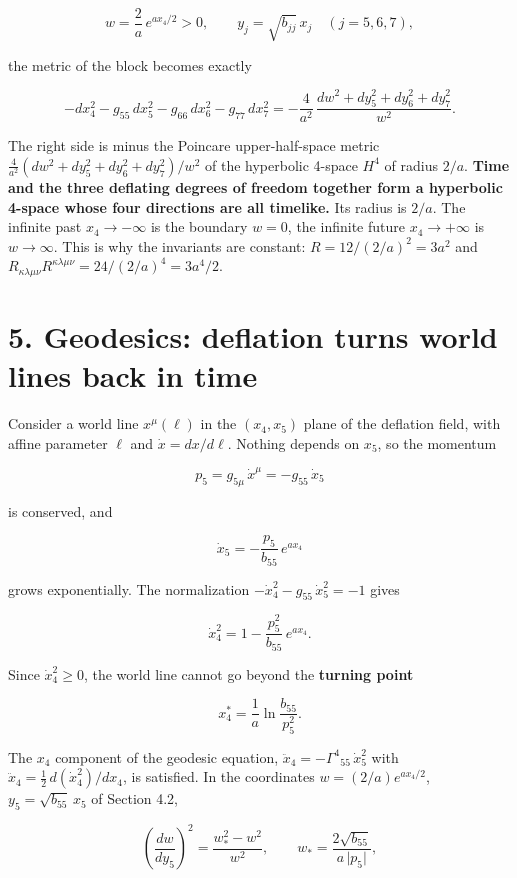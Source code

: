 \documentclass[10pt]{article}
\makeatletter
\newcommand\keepnext{\par\nopagebreak\@nobreaktrue\everypar{\@nobreakfalse\everypar{}}}
\makeatother
\begin{document}
\[
w = \frac2a\,e^{ax_4/2} > 0, \qquad y_j = \sqrt{b_{jj}}\,x_j \quad (j = 5, 6, 7),
\]

the metric of the block becomes exactly\keepnext


\[
-dx_4^2 - g_{55}\,dx_5^2 - g_{66}\,dx_6^2 - g_{77}\,dx_7^2 = -\frac{4}{a^2}\,\frac{dw^2 + dy_5^2 + dy_6^2 + dy_7^2}{w^2} .
\]

The right side is minus the Poincare upper-half-space metric $\frac{4}{a^2}(dw^2 + dy_5^2 + dy_6^2 + dy_7^2)/w^2$ of the hyperbolic 4-space $H^4$ of radius $2/a$. \textbf{Time and the three deflating degrees of freedom together form a hyperbolic 4-space whose four directions are all timelike.} Its radius is $2/a$. The infinite past $x_4 \to -\infty$ is the boundary $w = 0$, the infinite future $x_4 \to +\infty$ is $w \to \infty$. This is why the invariants are constant: $R = 12/(2/a)^2 = 3a^2$ and $R_{\kappa\lambda\mu\nu}R^{\kappa\lambda\mu\nu} = 24/(2/a)^4 = 3a^4/2$.


\section*{5. Geodesics: deflation turns world lines back in time}

Consider a world line $x^\mu(\ell)$ in the $(x_4, x_5)$ plane of the deflation field, with affine parameter $\ell$ and $\dot x = dx/d\ell$. Nothing depends on $x_5$, so the momentum\keepnext


\[
p_5 = g_{5\mu}\,\dot x^\mu = -g_{55}\,\dot x_5
\]

is conserved, and\keepnext


\[
\dot x_5 = -\frac{p_5}{b_{55}}\,e^{ax_4}
\]

grows exponentially. The normalization $-\dot x_4^2 - g_{55}\,\dot x_5^2 = -1$ gives\keepnext


\[
\dot x_4^2 = 1 - \frac{p_5^2}{b_{55}}\,e^{ax_4} .
\]

Since $\dot x_4^2 \ge 0$, the world line cannot go beyond the \textbf{turning point}\keepnext


\[
x_4^* = \frac1a\ln\frac{b_{55}}{p_5^2} .
\]

The $x_4$ component of the geodesic equation, $\ddot x_4 = -\Gamma^4{}_{55}\,\dot x_5^2$ with $\ddot x_4 = \frac12\,d(\dot x_4^2)/dx_4$, is satisfied. In the coordinates $w = (2/a)e^{ax_4/2}$, $y_5 = \sqrt{b_{55}}\,x_5$ of Section 4.2,\keepnext


\[
\left(\frac{dw}{dy_5}\right)^2 = \frac{w_*^2 - w^2}{w^2}, \qquad w_* = \frac{2\sqrt{b_{55}}}{a\,\lvert p_5\rvert} ,
\]
\end{document}
